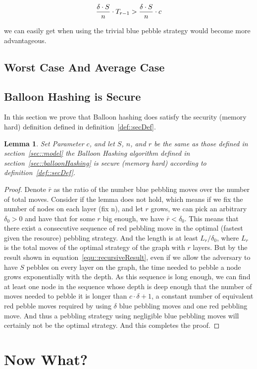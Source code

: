 \documentclass[a4paper]{article}
\newtheorem{lemma}{Lemma}
\begin{document}
\begin{align}
  \frac{\delta \cdot S}{n} \cdot T_{r - 1} > \frac{\delta \cdot S}{n} \cdot c\label{equ::rBound}
\end{align}

we can easily get when using the trivial blue pebble strategy would become more advantageous.

\subsection{Worst Case And Average Case}


\subsection{Balloon Hashing is Secure} %
In this section we prove that Balloon hashing does satisfy the security (memory hard) definition defined
in definition~\ref{def::secDef}.

\begin{lemma}
  Set Parameter $c$, and let $S$, $n$, and $r$ be the same as those defined in section~\ref{sec::model}
  the Balloon Hashing algorithm defined in section~\ref{sec::balloonHashing} is secure (memory hard)
  according to definition~\ref{def::secDef}.
\end{lemma}

\begin{proof}
  Denote $\bar{r}$ as the ratio of the number blue pebbling moves over the number of total moves. Consider if the
  lemma does not hold, which means if we fix the number of nodes on each layer (fix n), and let $r$ grows, we can pick
  an arbitrary $\delta_{0} >0$ and have that for some $r$ big enough, we have $\bar{r} < \delta_{0}$. This means that
  there exist a consecutive sequence of red pebbling move in the optimal (fastest given the resource) pebbling strategy.
  And the length is at least $L_{r} / \delta_{0}$, where $L_{r}$ is the total moves of the optimal strategy of the
  graph with $r$ layers.
  But by the result shown in equation~\ref{equ::recursiveResult}, even if we allow the adversary to have $S$ pebbles on
  every layer on the graph, the time needed to pebble a node grows exponentially with the depth. As this sequence is
  long enough, we can find at least one node in the sequence whose depth is deep enough that the number of moves needed
  to pebble it is longer than $c \cdot \delta + 1$, a constant number of equivalent red pebble moves required by using
  $\delta$ blue pebbling moves and one red pebbling move. And thus a pebbling strategy using negligible blue pebbling
  moves will certainly not be the optimal strategy. And this completes the proof.
\end{proof}

\section{Now What?}



\end{document}
